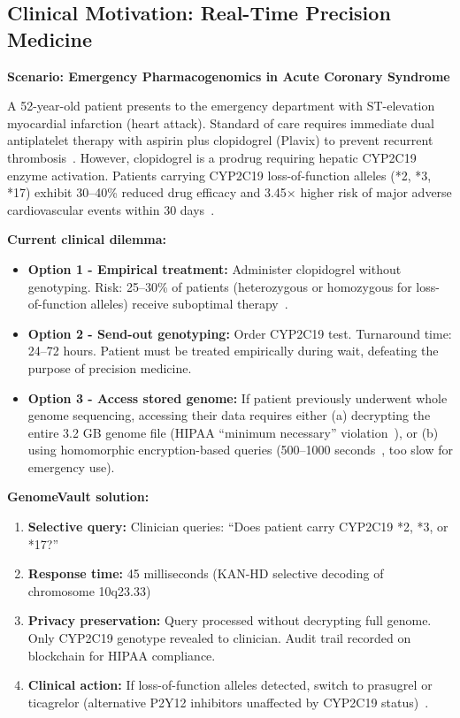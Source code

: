 
\subsection{Clinical Motivation: Real-Time Precision Medicine}

\textbf{Scenario: Emergency Pharmacogenomics in Acute Coronary Syndrome}

A 52-year-old patient presents to the emergency department with ST-elevation myocardial infarction (heart attack). Standard of care requires immediate dual antiplatelet therapy with aspirin plus clopidogrel (Plavix) to prevent recurrent thrombosis~\cite{Levine2016}. However, clopidogrel is a prodrug requiring hepatic CYP2C19 enzyme activation. Patients carrying CYP2C19 loss-of-function alleles (*2, *3, *17) exhibit 30--40\% reduced drug efficacy and 3.45× higher risk of major adverse cardiovascular events within 30 days~\cite{Mega2009,Scott2013}.

\textbf{Current clinical dilemma:}
\begin{itemize}
\item \textbf{Option 1 - Empirical treatment:} Administer clopidogrel without genotyping. Risk: 25--30\% of patients (heterozygous or homozygous for loss-of-function alleles) receive suboptimal therapy~\cite{Scott2013}.
\item \textbf{Option 2 - Send-out genotyping:} Order CYP2C19 test. Turnaround time: 24--72 hours. Patient must be treated empirically during wait, defeating the purpose of precision medicine.
\item \textbf{Option 3 - Access stored genome:} If patient previously underwent whole genome sequencing, accessing their data requires either (a) decrypting the entire 3.2 GB genome file (HIPAA ``minimum necessary'' violation~\cite{HIPAA2013}), or (b) using homomorphic encryption-based queries (500--1000 seconds~\cite{Ayday2013}, too slow for emergency use).
\end{itemize}

\textbf{GenomeVault solution:}
\begin{enumerate}
\item \textbf{Selective query:} Clinician queries: ``Does patient carry CYP2C19 *2, *3, or *17?''
\item \textbf{Response time:} 45 milliseconds (KAN-HD selective decoding of chromosome 10q23.33)
\item \textbf{Privacy preservation:} Query processed without decrypting full genome. Only CYP2C19 genotype revealed to clinician. Audit trail recorded on blockchain for HIPAA compliance.
\item \textbf{Clinical action:} If loss-of-function alleles detected, switch to prasugrel or ticagrelor (alternative P2Y12 inhibitors unaffected by CYP2C19 status)~\cite{Levine2016}.
\end{enumerate}

